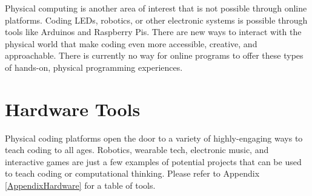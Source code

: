  Physical computing is another area of interest that is not possible through online platforms. Coding LEDs, robotics, or other electronic systems is possible through tools like Arduinos and Raspberry Pis. There are new ways to interact with the physical world that make coding even more accessible, creative, and approachable. There is currently no way for online programs to offer these types of hands-on, physical programming experiences. \par


\section{Hardware Tools}
Physical coding platforms open the door to a variety of highly-engaging ways to teach coding to all ages. Robotics, wearable tech, electronic music, and interactive games are just a few examples of potential projects that can be used to teach coding or computational thinking. Please refer to Appendix \ref{AppendixHardware} for a table of tools.